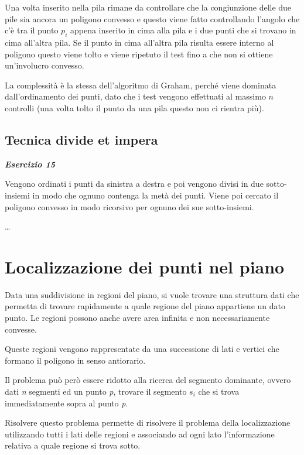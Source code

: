 Una volta inserito nella pila rimane da controllare che la congiunzione delle due pile sia ancora un poligono convesso e questo viene fatto controllando l'angolo che c'è tra il punto $p_i$ appena inserito in cima alla pila e i due punti che si trovano in cima all'altra pila. Se il punto in cima all'altra pila risulta essere interno al poligono questo viene tolto e viene ripetuto il test fino a che non si ottiene un'involucro convesso.

La complessità è la stessa dell'algoritmo di Graham, perché viene dominata dall'ordinamento dei punti, dato che i test vengono effettuati al massimo $n$ controlli (una volta tolto il punto da una pila questo non ci rientra più).

\subsection{Tecnica divide et impera}\label{tecnica-divide-et-impera-es-15}

\textbf{\textit{Esercizio 15}}

Vengono ordinati i punti da sinistra a destra e poi vengono divisi in due sotto-insiemi in modo che ognuno contenga la metà dei punti. 
Viene poi cercato il poligono convesso in modo ricorsivo per ognuno dei sue sotto-insiemi.

\ldots{}

\section{Localizzazione dei punti nel piano}\label{localizzazione-dei-punti-nel-piano}

Data una suddivisione in regioni del piano, si vuole trovare una struttura dati che permetta di trovare rapidamente a quale regione del piano appartiene un dato punto. 
Le regioni possono anche avere area infinita e non necessariamente convesse.

Queste regioni vengono rappresentate da una successione di lati e vertici che formano il poligono in senso antiorario.

Il problema può però essere ridotto alla ricerca del segmento dominante, ovvero dati \emph{n} segmenti ed un punto \emph{p}, trovare il segmento $s_i$ che si trova immediatamente sopra al punto \emph{p}.

Risolvere questo problema permette di risolvere il problema della localizzazione utilizzando tutti i lati delle regioni e associando ad ogni lato l'informazione relativa a quale regione si trova sotto.

